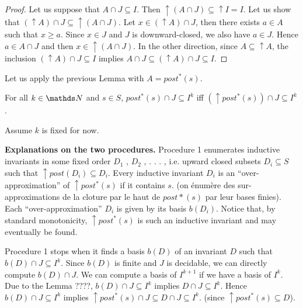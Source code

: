 \begin{proof}
Let us suppose that $A \cap J \subseteq I$. Then ${\uparrow (A \cap J)} \subseteq {\uparrow I} = I$.
Let us show that $({\uparrow A}) \cap J \subseteq {\uparrow (A \cap J)}$.
Let $x \in ({\uparrow A}) \cap J$, then there exists $a \in A$ such that $x \geq a$.
Since $x \in J$ and $J$ is downward-closed, we also have $a \in J$.
Hence $a \in A \cap J$ and then $x \in { \uparrow (A \cap J)}$.
In the other direction,
since $A \subseteq {\uparrow A}$, the inclusion
$({\uparrow  A}) \cap J \subseteq I$ implies
$A \cap J \subseteq ({\uparrow  A}) \cap J \subseteq I$.
\end{proof}

Let us apply the previous Lemma with $A=post^*(s)$.

\begin{corollary}
For all $k \in \N$ and $s \in S$,
$ post^*(s)\cap J \subseteq I^k $  iff $ (\uparrow  post^*(s)) \cap J \subseteq I^k$. 
\end{corollary}




Assume $k$ is fixed for now.

{\bf Explanations on the two procedures.}
Procedure 1 enumerates inductive invariants in some fixed order $D_1$ , $D_2$ , . . . , i.e. upward closed subsets $D_i \subseteq S$ such that $\uparrow post(D_i ) \subseteq D_i$. 
Every inductive invariant $D_i$ is an “over-approximation” of $\uparrow post^*(s)$ if it contains $s$.
(on énumère des sur-approximations de la cloture par le haut de $post*(s)$ par leur bases finies).
Each “over-approximation” $D_i$ is given by its basis $b(D_i)$. Notice that, by standard monotonicity, $\uparrow post^*(s)$ is such an inductive invariant and may
eventually be found.

Procedure 1 stops when it finds a basis $b(D)$ of an invariant $D$ such that
$b(D)  \cap J \subseteq I^k$.  Since $b(D)$ is finite and $J$ is decidable, we can
directly compute $b(D)  \cap J$.
We can compute a basis
of $I^{k+1}$ if we have a basis of $I^k$. %
Due to the Lemma ????, 
$b(D)  \cap J \subseteq I^k$ implies
$D  \cap J \subseteq I^k$.
Hence
$b(D)  \cap J \subseteq I^k$ implies
$\uparrow post^*(s) \cap J \subseteq D  \cap J \subseteq I^k$.
(since $ \uparrow post^*(s)  \subseteq D$).



